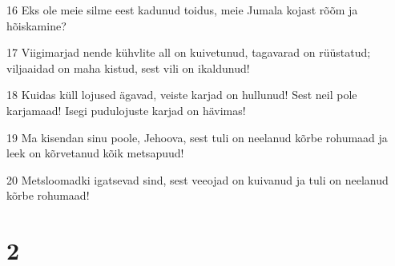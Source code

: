 \par 16 Eks ole meie silme eest kadunud toidus, meie Jumala kojast rõõm ja hõiskamine? 
\par 17 Viigimarjad nende kühvlite all on kuivetunud, tagavarad on rüüstatud; viljaaidad on maha kistud, sest vili on ikaldunud! 
\par 18 Kuidas küll lojused ägavad, veiste karjad on hullunud! Sest neil pole karjamaad! Isegi pudulojuste karjad on hävimas! 
\par 19 Ma kisendan sinu poole, Jehoova, sest tuli on neelanud kõrbe rohumaad ja leek on kõrvetanud kõik metsapuud! 
\par 20 Metsloomadki igatsevad sind, sest veeojad on kuivanud ja tuli on neelanud kõrbe rohumaad! 

\chapter{2}

